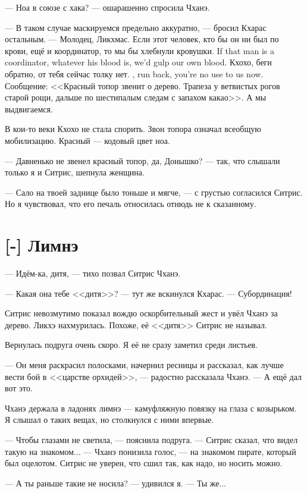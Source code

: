 --- Ноа в союзе с хака? --- ошарашенно спросила Чханэ.

--- В таком случае маскируемся предельно аккуратно, --- бросил Кхарас остальным.
--- Молодец, Ликхмас.
{Если этот человек, кто бы он ни был по крови, ещё и координатор, то мы бы хлебнули кровушки.}
{If that man is a coordinator, whatever his blood is, we'd gulp our own blood.}
{Кхохо, беги обратно, от тебя сейчас толку нет.}
{\Kchoho, run back, you're no use to us now.}
Сообщение: <<Красный топор звенит о дерево.
Трапеза у ветвистых рогов старой рощи, дальше по шестипалым следам с запахом какао>>.
А мы выдвигаемся.

В кои-то веки Кхохо не стала спорить.
Звон топора означал всеобщую мобилизацию.
Красный --- кодовый цвет ноа.

--- Давненько не звенел красный топор, да, Донышко? --- так, что слышали только я и Ситрис, шепнула женщина.

--- Сало на твоей заднице было тоньше и мягче, --- с грустью согласился Ситрис.
Но я чувствовал, что его печаль относилась отнюдь не к сказанному.

\section{[-] Лимнэ}

\textspace

--- Идём-ка, дитя, --- тихо позвал Ситрис Чханэ.

--- Какая она тебе <<дитя>>? --- тут же вскинулся Кхарас.
--- Субординация!

Ситрис невозмутимо показал вождю оскорбительный жест и увёл Чханэ за дерево.
Ликхэ нахмурилась.
Похоже, её <<дитя>> Ситрис не называл.

Вернулась подруга очень скоро.
Я её не сразу заметил среди листьев.

--- Он меня раскрасил полосками, начернил ресницы и рассказал, как лучше вести бой в <<царстве орхидей>>, --- радостно рассказала Чханэ.
--- А ещё дал вот это.

Чханэ держала в ладонях лимнэ --- камуфляжную повязку на глаза с козырьком.
Я слышал о таких вещах, но столкнулся с ними впервые.

--- Чтобы глазами не светила, --- пояснила подруга.
--- Ситрис сказал, что видел такую на знакомом... --- Чханэ понизила голос, --- на знакомом пирате, который был оцелотом.
Ситрис не уверен, что сшил так, как надо, но носить можно.

--- А ты раньше такие не носила? --- удивился я.
--- Ты же...

